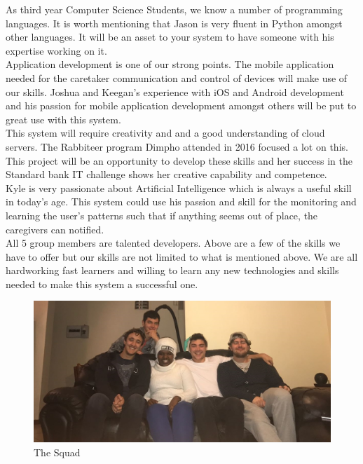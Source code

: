 \documentclass[12pt]{article}
\begin{document}
	As third year Computer Science Students, we know a number of programming languages. It is worth mentioning that Jason is very fluent in Python amongst other languages. It will be an asset to your system to have someone with his expertise working on it.\\
	
	
	Application development is one of our strong points. The mobile application needed for the caretaker communication and control of devices will make use of our skills. Joshua and Keegan's experience with iOS and Android development and his passion for mobile application development amongst others will be put to great use with this system.\\
	
	This system will require creativity and and a good understanding of cloud servers. The Rabbiteer program Dimpho attended in 2016 focused a lot on this. This project will be an opportunity to develop these skills and her success in the Standard bank IT challenge shows her creative capability and competence.\\
	
	Kyle is very passionate about Artificial Intelligence which is always a useful skill in today's age. This system could use his passion and skill for the monitoring and learning the user's patterns such that if anything seems out of place, the caregivers can notified.\\
	
	All 5 group members are talented developers. Above are a few of the skills we have to offer but our skills are not limited to what is mentioned above. We are all hardworking fast learners and willing to learn any new technologies and skills needed to make this system a successful one. \\
	\begin{figure}[htb]
	\centering
	\includegraphics[width=\textwidth]{../Common/team.jpg}
	\caption{The Squad}
	\end{figure}\\
	
\end{document}
